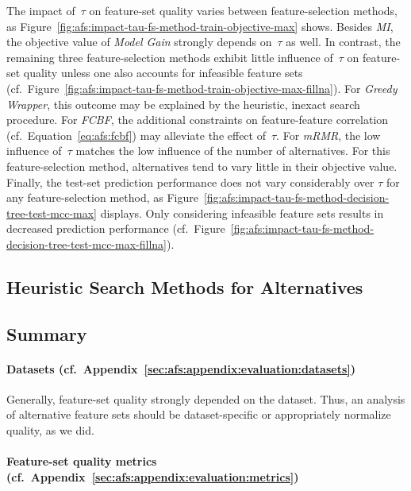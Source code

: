 \documentclass{article}
\theoremstyle{definition}
\begin{document}
The impact of~$\tau$ on feature-set quality varies between feature-selection methods, as Figure~\ref{fig:afs:impact-tau-fs-method-train-objective-max} shows.
Besides \emph{MI}, the objective value of \emph{Model Gain} strongly depends on~$\tau$ as well.
In contrast, the remaining three feature-selection methods exhibit little influence of~$\tau$ on feature-set quality unless one also accounts for infeasible feature sets (cf.~Figure~\ref{fig:afs:impact-tau-fs-method-train-objective-max-fillna}).
For \emph{Greedy Wrapper}, this outcome may be explained by the heuristic, inexact search procedure.
For \emph{FCBF}, the additional constraints on feature-feature correlation (cf.~Equation~\ref{eq:afs:fcbf}) may alleviate the effect of~$\tau$.
For \emph{mRMR}, the low influence of~$\tau$ matches the low influence of the number of alternatives.
For this feature-selection method, alternatives tend to vary little in their objective value.
Finally, the test-set prediction performance does not vary considerably over $\tau$ for any feature-selection method, as Figure~\ref{fig:afs:impact-tau-fs-method-decision-tree-test-mcc-max} displays.
Only considering infeasible feature sets results in decreased prediction performance (cf.~Figure~\ref{fig:afs:impact-tau-fs-method-decision-tree-test-mcc-max-fillna}).

\subsection{Heuristic Search Methods for Alternatives}
\label{sec:afs:evaluation:heuristic-search-methods}


\subsection{Summary}
\label{sec:afs:evaluation:summary}

\paragraph{Datasets (cf.~Appendix~\ref{sec:afs:appendix:evaluation:datasets})}

Generally, feature-set quality strongly depended on the dataset.
Thus, an analysis of alternative feature sets should be dataset-specific or appropriately normalize quality, as we did.

\paragraph{Feature-set quality metrics (cf.~Appendix~\ref{sec:afs:appendix:evaluation:metrics})}
\end{document}
